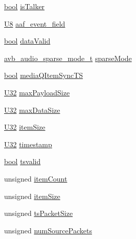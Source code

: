 \begin{DoxyCompactItemize}
\item 
\hyperlink{avb__gptp_8h_af6a258d8f3ee5206d682d799316314b1}{bool} \hyperlink{structpvt__data__t_a8de147c7de1f14e247981efec57e77a4}{is\+Talker}
\item 
\hyperlink{openavb__types__base__pub_8h_aa63ef7b996d5487ce35a5a66601f3e73}{U8} \hyperlink{structpvt__data__t_a14f1c7db26854a3afc01ce3b520d39d6}{aaf\+\_\+event\+\_\+field}
\item 
\hyperlink{avb__gptp_8h_af6a258d8f3ee5206d682d799316314b1}{bool} \hyperlink{structpvt__data__t_ae027c1868c7c7379501f78f8973c95e8}{data\+Valid}
\item 
\hyperlink{openavb__map__aaf__audio_8c_af4359f8edef6a32baf92eb80ec13176a}{avb\+\_\+audio\+\_\+sparse\+\_\+mode\+\_\+t} \hyperlink{structpvt__data__t_aac6ba6c4ddae09e70335935026b3f183}{sparse\+Mode}
\item 
\hyperlink{avb__gptp_8h_af6a258d8f3ee5206d682d799316314b1}{bool} \hyperlink{structpvt__data__t_a4dfb6959744d8eb6b01a014fd1a7b75b}{media\+Q\+Item\+Sync\+TS}
\item 
\hyperlink{openavb__types__base__pub_8h_a696390429f2f3b644bde8d0322a24124}{U32} \hyperlink{structpvt__data__t_a41116ea77bd2a5f8dc80bbe814719ee1}{max\+Payload\+Size}
\item 
\hyperlink{openavb__types__base__pub_8h_a696390429f2f3b644bde8d0322a24124}{U32} \hyperlink{structpvt__data__t_a2fe8c370399accee1fc69c230b84564a}{max\+Data\+Size}
\item 
\hyperlink{openavb__types__base__pub_8h_a696390429f2f3b644bde8d0322a24124}{U32} \hyperlink{structpvt__data__t_a91e248b2730fbe7951ac5d9d3aae1752}{item\+Size}
\item 
\hyperlink{openavb__types__base__pub_8h_a696390429f2f3b644bde8d0322a24124}{U32} \hyperlink{structpvt__data__t_a789796b7042ad0c179aca7d160c8def8}{timestamp}
\item 
\hyperlink{avb__gptp_8h_af6a258d8f3ee5206d682d799316314b1}{bool} \hyperlink{structpvt__data__t_ad5783c4b5eb44f07342aed4e6f5b346c}{tsvalid}
\item 
unsigned \hyperlink{structpvt__data__t_ab966e984215733eae3e8b7f637106513}{item\+Count}
\item 
unsigned \hyperlink{structpvt__data__t_aad3cd018522c7d05ee74425ab1d3ad72}{item\+Size}
\item 
unsigned \hyperlink{structpvt__data__t_aa01d4378c00bfa8a08b48c2f49974fb1}{ts\+Packet\+Size}
\item 
unsigned \hyperlink{structpvt__data__t_a8c71e240a0df348901568256de6c382b}{num\+Source\+Packets}

\end{DoxyCompactItemize}
